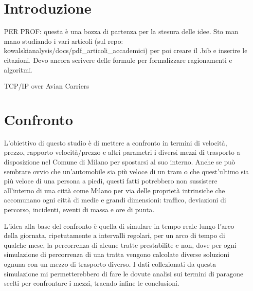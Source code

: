 \documentclass[a4paper]{report}
\begin{document}
	\tableofcontents
	\listoftodos
	
	\chapter{Introduzione}
	{\LARGE
		PER PROF: questa è una bozza di partenza per la stesura delle idee. Sto man mano studiando i vari articoli (sul repo: kowalskianalysis/docs/pdf\_articoli\_accademici) per poi creare il .bib e inserire le citazioni. Devo ancora scrivere delle formule per formalizzare ragionamenti e algoritmi.
	}
	\linebreak


	TCP/IP over Avian Carriers\cite{waitzman1990standard}
	
	\chapter{Confronto}
	{\large
		L'obiettivo di questo studio è di mettere a confronto in termini di velocità, prezzo, rapporto velocità/prezzo e altri parametri i diversi mezzi di trasporto a disposizione nel Comune di Milano per spostarsi al suo interno. Anche se può sembrare ovvio che un'automobile sia più veloce di un tram o che quest'ultimo sia più veloce di una persona a piedi, questi fatti potrebbero non sussistere all'interno di una città come Milano per via delle proprietà intrinsiche che accomunano ogni città di medie e grandi dimensioni: traffico, deviazioni di percorso, incidenti, eventi di massa e ore di punta.
	}

	{\large
		L'idea alla base del confronto è quella di simulare in tempo reale lungo l'arco della giornata, ripetutamente a intervalli regolari, per un arco di tempo di qualche mese, la percorrenza di alcune tratte prestabilite e non, dove per ogni simulazione di percorrenza di una tratta vengono calcolate diverse soluzioni ognuna con un mezzo di trasporto diverso. I dati collezionati da questa simulazione mi permetterebbero di fare le dovute analisi sui termini di paragone scelti per confrontare i mezzi, traendo infine le conclusioni.
	}
\end{document}
